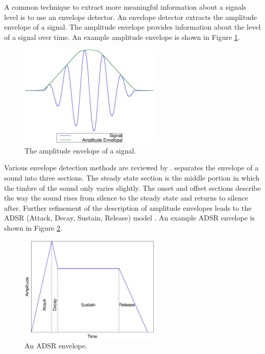 		A common technique to extract more meaningful information about a signals level is to use an envelope
		detector. An envelope detector extracts the amplitude envelope of a signal. The amplitude envelope provides
		information about the level of a signal over time. An example amplitude envelope is shown in Figure
		\ref{fig:AmplitudeEnvelope}.

		\begin{figure}[h!]
			\centering
			\includegraphics[width=0.6\textwidth]{chapter2/Images/AmplitudeEnvelope.eps}
			\caption{The amplitude envelope of a signal.}
			\label{fig:AmplitudeEnvelope}
		\end{figure}

		Various envelope detection methods are reviewed by \citet{chang2007a}. \citet{howard2009acoustics} separates
		the envelope of a sound into three sections. The steady state section is the middle portion in which the
		timbre of the sound only varies slightly. The onset and offset sections describe the way the sound rises
		from silence to the steady state and returns to silence after. Further refinement of the description of
		amplitude envelopes leads to the ADSR (Attack, Decay, Sustain, Release) model \citep{descrivan2012music}. An
		example ADSR envelope is shown in Figure \ref{fig:ADSR}.

		\begin{figure}[h!]
			\centering
			\includegraphics[width=0.6\textwidth]{chapter2/Images/ADSR.eps}
			\caption{An ADSR envelope.}
			\label{fig:ADSR}
		\end{figure}

